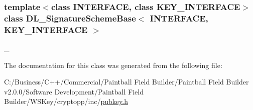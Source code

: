 \subsubsection*{template$<$class INTERFACE, class KEY\_\-INTERFACE$>$ class DL\_\-SignatureSchemeBase$<$ INTERFACE, KEY\_\-INTERFACE $>$}

\_\- 

The documentation for this class was generated from the following file:\begin{DoxyCompactItemize}
\item 
C:/Business/C++/Commercial/Paintball Field Builder/Paintball Field Builder v2.0.0/Software Development/Paintball Field Builder/WSKey/cryptopp/inc/\hyperlink{pubkey_8h}{pubkey.h}\end{DoxyCompactItemize}
